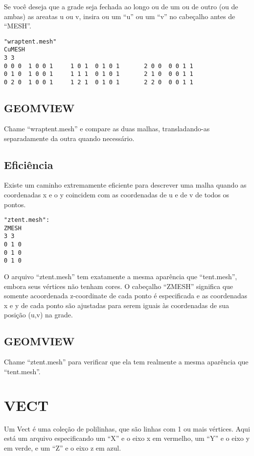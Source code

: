 \documentclass[12pt,a4paper]{book}
\begin{document}
Se voc\^e deseja que a grade seja fechada ao longo ou de um ou de outro (ou de ambas) as areatas
u ou v, insira ou um ``u'' ou um ``v'' no cabe\c{c}alho antes de
``MESH''.
\begin{verbatim}
"wraptent.mesh" 
CuMESH
3 3
0 0 0  1 0 0 1	   1 0 1  0 1 0 1	    2 0 0  0 0 1 1
0 1 0  1 0 0 1	   1 1 1  0 1 0 1	    2 1 0  0 0 1 1
0 2 0  1 0 0 1	   1 2 1  0 1 0 1	    2 2 0  0 0 1 1
\end{verbatim}

\section{GEOMVIEW}

Chame ``wraptent.mesh'' e compare as duas malhas, transladando-as
separadamente da outra quando necess\'ario.

\section{Efici\^encia}

Existe um caminho extremamente eficiente para descrever uma malha quando as coordenadas
x e o y coincidem com as coordenadas de u e de v de todos os pontos.

\begin{verbatim}
"ztent.mesh":
ZMESH
3 3
0 1 0
0 1 0
0 1 0
\end{verbatim}

O arquivo ``ztent.mesh'' tem exatamente a mesma apar\^encia que ``tent.mesh'', embora seus
v\'ertices n\~ao tenham cores. O cabe\c{c}alho ``ZMESH'' significa que somente
acoordenada z-coordinate de cada ponto \'e especificada e as coordenadas
x e y de cada ponto s\~ao ajustadas para serem iguais \`as coordenadas de sua posi\c{c}\~ao (u,v) na
grade.

\section{GEOMVIEW}

Chame ``ztent.mesh'' para verificar que ela tem realmente a mesma apar\^encia que ``tent.mesh''.

\chapter{VECT}

Um Vect \'e uma cole\c{c}\~ao de polilinhas, que s\~ao linhas com 1 ou mais
v\'ertices. Aqui est\'a um arquivo especificando um ``X'' e o eixo x em vermelho, um ``Y''
e o eixo y em verde, e um ``Z'' e o eixo z em azul.
\end{document}
